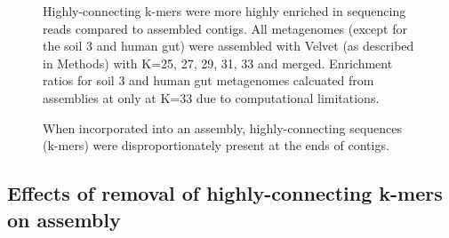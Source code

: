 \documentclass[11pt]{article} %
\begin{document}
\begin{figure}
\caption{Highly-connecting k-mers were more highly enriched in sequencing reads compared to assembled contigs.  All metagenomes (except for the soil 3 and human gut) were assembled with Velvet (as described in Methods) with K=25, 27, 29, 31, 33 and merged.  Enrichment ratios for soil 3 and human gut metagenomes calcuated from assemblies at only at K=33 due to computational limitations.}
\end{figure}

\begin{figure}
\caption{When incorporated into an assembly, highly-connecting sequences (k-mers) were disproportionately present at the ends of contigs.}
\end{figure}

\subsection{Effects of removal of highly-connecting k-mers on assembly}
\end{document}
